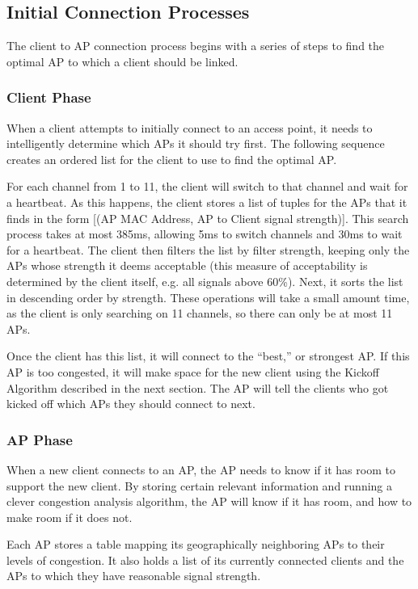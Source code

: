\documentclass[journal]{IEEEtran}
\begin{document}
\subsection{Initial Connection Processes}
The client to AP connection process begins with a series of steps to find the optimal AP to which a client should be linked.
 
\subsubsection{Client Phase}
When a client attempts to initially connect to an access point, it needs to intelligently determine which APs it should try first. The following sequence creates an ordered list for the client to use to find the optimal AP.
 
For each channel from 1 to 11, the client will switch to that channel and wait for a heartbeat. As this happens, the client stores a list of tuples for the APs that it finds in the form [(AP MAC Address, AP to Client signal strength)]. This search process takes at most 385ms, allowing 5ms to switch channels and 30ms to wait for a heartbeat. The client then filters the list by filter strength, keeping only the APs whose strength it deems acceptable (this measure of acceptability is determined by the client itself, e.g. all signals above 60\%). Next, it sorts the list in descending order by strength. These operations will take a small amount time, as the client is only searching on 11 channels, so there can only be at most 11 APs.
 
Once the client has this list, it will connect to the “best,” or strongest AP. If this AP is too congested, it will make space for the new client using the Kickoff Algorithm described in the next section. The AP will tell the clients who got kicked off which APs they should connect to next.
 
\subsubsection{AP Phase}
When a new client connects to an AP, the AP needs to know if it has room to support the new client. By storing certain relevant information and running a clever congestion analysis algorithm, the AP will know if it has room, and how to make room if it does not.
 
Each AP stores a table mapping its geographically neighboring APs to their levels of congestion. It also holds a list of its currently connected clients and the APs to which they have reasonable signal strength.
 
\end{document}
